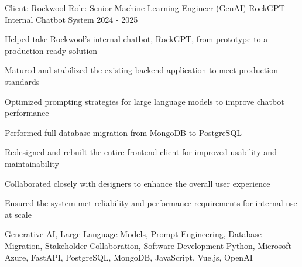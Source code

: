 


\begin{cventries}


\cventry
{Client: Rockwool \newline Role: Senior Machine Learning Engineer (GenAI)} %
{RockGPT – Internal Chatbot System} %
{}%
{2024 - 2025} %
{ %
\begin{cvitems}
\item {Helped take Rockwool's internal chatbot, RockGPT, from prototype to a production-ready solution}
\item {Matured and stabilized the existing backend application to meet production standards}
\item {Optimized prompting strategies for large language models to improve chatbot performance}
\item {Performed full database migration from MongoDB to PostgreSQL}
\item {Redesigned and rebuilt the entire frontend client for improved usability and maintainability}
\item {Collaborated closely with designers to enhance the overall user experience}
\item {Ensured the system met reliability and performance requirements for internal use at scale}
\end{cvitems}
\cventrykeywords
{Generative AI, Large Language Models, Prompt Engineering, Database Migration, Stakeholder Collaboration, Software Development}
{Python, Microsoft Azure, FastAPI, PostgreSQL, MongoDB, JavaScript, Vue.js, OpenAI}
}


\end{cventries}

